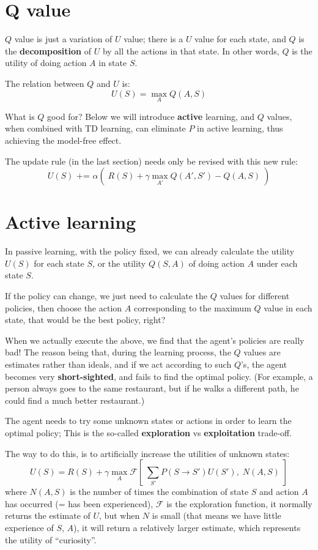 \documentclass[orivec]{llncs}
\begin{document}
\section{Q value}

$Q$ value is just a variation of $U$ value;  there is a $U$ value for each state, and $Q$ is the \textbf{decomposition} of $U$ by all the actions in that state.  In other words, $Q$ is the utility of doing action $A$ in state $S$.

The relation between $Q$ and $U$ is:
$$ U(S) = \max_A  Q(A, S) $$

What is $Q$ good for?  Below we will introduce \textbf{active} learning, and $Q$ values, when combined with TD learning, can eliminate $P$ in active learning, thus achieving the model-free effect.

The update rule (in the last section) needs only be revised with this new rule:
$$ U(S) \mbox{  +=  } \alpha ( \; R(S) + \gamma \max_{A'}  Q(A', S') - Q(A, S) \; ) $$

\section{Active learning}

In passive learning, with the policy fixed, we can already calculate the utility $U(S)$ for each state $S$, or the utility $Q(S,A)$ of doing action $A$ under each state $S$.

If the policy can change, we just need to calculate the $Q$ values for different policies, then choose the action $A$ corresponding to the maximum $Q$ value in each state, that would be the best policy, right?

When we actually execute the above, we find that the agent's policies are really bad!  The reason being that, during the learning process, the $Q$ values are estimates rather than ideals, and if we act according to such $Q$'s, the agent becomes very \textbf{short-sighted}, and fails to find the optimal policy.  (For example, a person always goes to the same restaurant, but if he walks a different path, he could find a much better restaurant.)

The agent needs to try some unknown states or actions in order to learn the optimal policy;  This is the so-called \textbf{exploration} vs \textbf{exploitation} trade-off.

The way to do this, is to artificially increase the utilities of unknown states:
$$ U(S) = R(S) + \gamma \max_A \mathcal{F}[ \; \sum_{S'} P(S \rightarrow S') U(S'), \; N(A, S) \; ] $$
where $N(A, S)$ is the number of times the combination of state $S$ and action $A$ has occurred (= has been experienced), $\mathcal{F}$ is the exploration function, it normally returns the estimate of $U$, but when $N$ is small (that means we have little experience of $S$, $A$), it will return a relatively larger estimate, which represents the utility of ``curiosity''.





\end{document}
